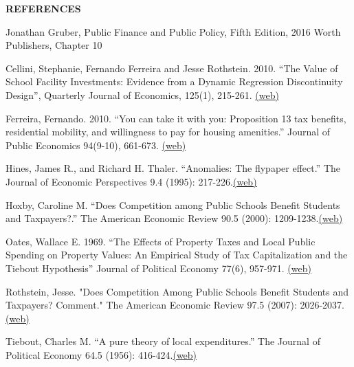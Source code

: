 \documentclass[landscape]{slides}
\begin{document}
\begin{slide}
\begin{center}
{\bf REFERENCES}
\end{center}
{\small

Jonathan Gruber, Public Finance and Public Policy, Fifth Edition, 2016 Worth Publishers, Chapter 10

Cellini, Stephanie, Fernando Ferreira and Jesse Rothstein. 2010. ``The Value of School Facility Investments: Evidence from a Dynamic Regression Discontinuity Design'',
Quarterly Journal of Economics, 125(1), 215-261.
\href{https://www.jstor.org/stable/pdf/40506281.pdf}{(web)}

Ferreira, Fernando. 2010. ``You can take it with you: Proposition 13 tax benefits, residential mobility, and willingness to pay for housing amenities.'' Journal of Public Economics 94(9-10), 661-673.
\href{http://elsa.berkeley.edu/~saez/course131/ferreira10.pdf}{(web)}

Hines, James R., and Richard H. Thaler. ``Anomalies: The flypaper effect.'' The Journal of Economic Perspectives 9.4 (1995): 217-226.\href{http://www.jstor.org/stable/pdfplus/2138399.pdf}{(web)}

Hoxby, Caroline M. ``Does Competition among Public Schools Benefit Students and Taxpayers?.'' The American Economic Review 90.5 (2000): 1209-1238.\href{http://elsa.berkeley.edu/~saez/course131/hoxby00.pdf}{(web)}



Oates, Wallace E. 1969. ``The Effects of Property Taxes and Local Public Spending on Property Values: An Empirical Study of Tax Capitalization and the Tiebout Hypothesis''
Journal of Political Economy 77(6), 957-971.
\href{https://www.jstor.org/stable/pdf/1837209.pdf}{(web)}



Rothstein, Jesse. "Does Competition Among Public Schools Benefit Students and Taxpayers? Comment." The American Economic Review 97.5 (2007): 2026-2037.\href{http://www.jstor.org/stable/pdfplus/10.2307/30034599.pdf}{(web)}

Tiebout, Charles M. ``A pure theory of local expenditures.'' The Journal of Political Economy 64.5 (1956): 416-424.\href{http://www.jstor.org/stable/pdfplus/1826343.pdf}{(web)}

}

\end{slide}
\end{document}
